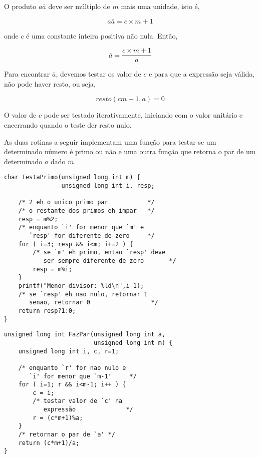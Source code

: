 \documentclass[a4paper,12pt,oneside,onecolumn]{uerj}
\begin{document}
O produto $a\bar a$ deve ser múltiplo de $m$ mais uma unidade, isto é,

\begin{equation}
a\bar a = c\times m+1
\end{equation}

\noindent onde $c$ é uma constante inteira positiva não nula. Então,

\begin{equation}
\bar a = \frac{c\times m+1}{a}
\end{equation}

\noindent Para encontrar $\bar a$, devemos testar os valor de $c$ e para que a expressão seja válida, não pode haver resto, ou seja,

\begin{equation}
resto(cm+1,a)=0
\end{equation}

\noindent O valor de $c$ pode ser testado iterativamente, iniciando com o valor unitário e encerrando quando o teste der resto nulo.

As duas rotinas a seguir implementam uma função para testar se um determinado número é primo ou não e uma outra função que retorna o par de um determinado $a$ dado $m$.

\begin{verbatim}
char TestaPrimo(unsigned long int m) {
                unsigned long int i, resp;

    /* 2 eh o unico primo par           */
    /* o restante dos primos eh impar   */
    resp = m%2;
    /* enquanto `i' for menor que `m' e
       `resp' for diferente de zero     */
    for ( i=3; resp && i<m; i+=2 ) {
        /* se `m' eh primo, entao `resp' deve
           ser sempre diferente de zero       */
        resp = m%i;
    }
    printf("Menor divisor: %ld\n",i-1);
    /* se `resp' eh nao nulo, retornar 1
       senao, retornar 0                 */
    return resp?1:0;
}
\end{verbatim}

\begin{verbatim}
unsigned long int FazPar(unsigned long int a,
                         unsigned long int m) {
    unsigned long int i, c, r=1;

    /* enquanto `r' for nao nulo e 
       `i' for menor que `m-1'     */
    for ( i=1; r && i<m-1; i++ ) {
        c = i;
        /* testar valor de `c' na 
           expressão              */
        r = (c*m+1)%a;
    }
    /* retornar o par de `a' */
    return (c*m+1)/a;
}
\end{verbatim}
\end{document}
